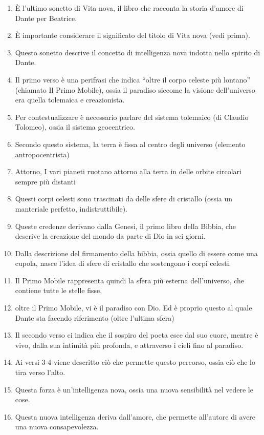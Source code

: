 \documentclass{article}
\begin{document}
\begin{enumerate}
    \item È l'ultimo sonetto di Vita nova, il libro che racconta la storia d'amore di Dante
    per Beatrice.
    \item È importante considerare il significato del titolo di Vita nova (vedi prima).
    \item Questo sonetto descrive il concetto di intelligenza nova indotta nello spirito di Dante.
    \item Il primo verso è una perifrasi che indica “oltre il corpo celeste più lontano” (chiamato Il Primo Mobile), ossia il
    paradiso siccome la visione dell’universo era quella tolemaica e creazionista.
    \item Per contestualizzare è necessario parlare del sistema tolemaico (di Claudio Tolomeo), ossia il sistema geocentrico.
    \item Secondo questo sistema, la terra è fissa al centro degli universo (elemento antropocentrista)
    \item Attorno, I vari pianeti ruotano attorno alla terra in delle orbite circolari sempre più distanti
    \item Questi corpi celesti sono trascinati da delle sfere di cristallo (ossia un manteriale perfetto, indistruttibile).
    \item Queste credenze derivano dalla Genesi, il primo libro della Bibbia, che descrive la creazione del mondo da parte di Dio in sei giorni.
    \item Dalla descrizione del firmamento della bibbia, ossia quello di essere come una cupola, nasce l'idea di sfere di cristallo che sostengono i corpi celesti.
    \item Il Primo Mobile rappresenta quindi la sfera più esterna dell'universo, che contiene tutte le stelle fisse.
    \item oltre il Primo Mobile, vi è il paradiso con Dio. Ed è proprio questo al quale Dante sta facendo riferimento (oltre l'ultima sfera)
    \item Il secondo verso ci indica che il sospiro del poeta esce dal suo cuore, mentre è vivo, dalla sua intimità più
    profonda, e attraverso i cieli fino al paradiso.
    \item Ai versi 3-4 viene descritto ciò che permette questo percorso, ossia ciò che lo tira verso l’alto.
    \item Questa forza è un’intelligenza nova, ossia una nuova sensibilità nel vedere le cose.
    \item Questa nuova intelligenza deriva dall’amore, che permette all’autore di avere una nuova consapevolezza.

\end{enumerate}
\end{document}
